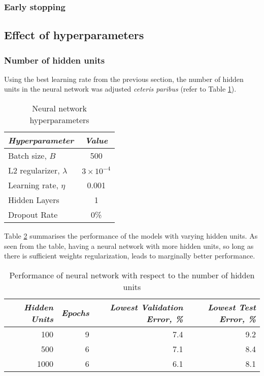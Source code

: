 \documentclass[a4paper,12pt]{article}
\begin{document}
\subsubsection{Early stopping}

\clearpage
\subsection{Effect of hyperparameters}
\subsubsection{Number of hidden units}
Using the best learning rate from the previous section, the number of hidden units in the neural network was adjusted \textit{ceteris paribus} (refer to Table \ref{table:NN_HParam_2_3_1}).

\begin{table}[!htb]
\centering
\caption{Neural network hyperparameters}
\label{table:NN_HParam_2_3_1}
\vspace{0.5em}
\begin{tabular}{|l|c|} \hline
\textit{Hyperparameter} & \textit{Value} \\ \hline
Batch size, $B$ & 500 \\
L2 regularizer, $\lambda$ & $3 \times 10^{-4}$  \\
Learning rate, $\eta$ & 0.001 \\
Hidden Layers & 1 \\
Dropout Rate & 0\% \\
\hline
\end{tabular}
\end{table}

Table \ref{table:NN_NumUnits} summarises the performance of the models with varying hidden units. As seen from the table, having a neural network with more hidden units, so long as there is sufficient weights regularization, leads to marginally better performance.

\begin{table}[!htb]
\centering
\caption{Performance of neural network with respect to the number of hidden units}
\label{table:NN_NumUnits}
\vspace{0.5em}
\begin{tabular}{|r|r r r|} \hline
\textit{Hidden Units} & \textit{Epochs} & \textit{Lowest Validation Error, \%} & \textit{Lowest Test Error, \%} \\ \hline
100 & 9 & 7.4 & 9.2 \\
500 & 6 & 7.1 & 8.4 \\
1000 & 6 & 6.1 & 8.1 \\
\hline
\end{tabular}
\end{table}
\end{document}
